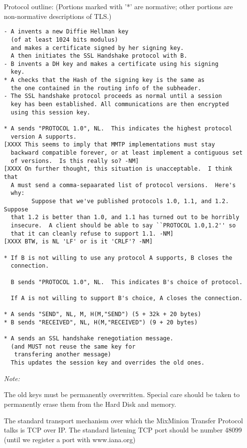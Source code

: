Protocol outline: (Portions marked with '*' are normative; other
portions are non-normative descriptions of TLS.)

\begin{verbatim}
- A invents a new Diffie Hellman key 
  (of at least 1024 bits modulus)
  and makes a certificate signed by her signing key.
  A then initiates the SSL Handshake protocol with B.
- B invents a DH key and makes a certificate using his signing
  key.
* A checks that the Hash of the signing key is the same as
  the one contained in the routing info of the subheader.
- The SSL handshake protocol proceeds as normal until a session
  key has been established. All communications are then encrypted
  using this session key.

* A sends "PROTOCOL 1.0", NL.  This indicates the highest protocol
  version A supports.
[XXXX This seems to imply that MMTP implementations must stay
  backward compatible forever, or at least implement a contiguous set 
  of versions.  Is this really so? -NM]
[XXXX On further thought, this situation is unacceptable.  I think that 
  A must send a comma-sepaarated list of protocol versions.  Here's
  why:
        Suppose that we've published protocols 1.0, 1.1, and 1.2.  Suppose
  that 1.2 is better than 1.0, and 1.1 has turned out to be horribly 
  insecure.  A client should be able to say ``PROTOCOL 1.0,1.2'' so
  that it can cleanly refuse to support 1.1. -NM] 
[XXXX BTW, is NL 'LF' or is it 'CRLF'? -NM]

* If B is not willing to use any protocol A supports, B closes the 
  connection.

  B sends "PROTOCOL 1.0", NL.  This indicates B's choice of protocol.

  If A is not willing to support B's choice, A closes the connection.

* A sends "SEND", NL, M, H(M,"SEND") (5 + 32k + 20 bytes)
* B sends "RECEIVED", NL, H(M,"RECEIVED") (9 + 20 bytes)

* A sends an SSL handshake renegotiation message.
  (and MUST not reuse the same key for 
   transfering another message)
  This updates the session key and overrides the old ones.
\end{verbatim}

\emph{Note:}

The old keys must be permanently overwritten. Special care should be
taken to permanently erase them from the Hard Disk and memory. 

The standard transport mechanism over which the MixMinion Transfer
Protocol talks is TCP over IP. The standard listening TCP port should be 
number 48099 (until we register a port with www.iana.org)

